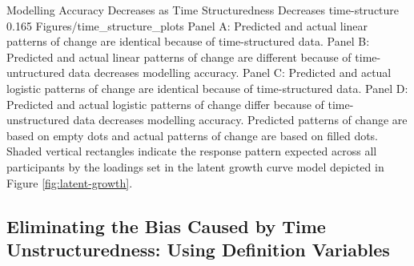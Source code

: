 \documentclass[
12pt, %
twoside,
english]{guelphthesis}
\begin{document}
\begin{apaFigure}
[portrait]
[samepage]
[-0.2cm]
{Modelling Accuracy Decreases as Time Structuredness Decreases}
{time-structure}
{0.165}
{Figures/time_structure_plots}
{Panel A: Predicted and actual linear patterns of change are identical because of time-structured data. Panel B: Predicted and actual linear patterns of change are different because of time-untructured data decreases modelling accuracy. Panel C: Predicted and actual logistic patterns of change are identical because of time-structured data. Panel D: Predicted and actual logistic patterns of change differ because of time-unstructured data decreases modelling accuracy. Predicted patterns of change are based on empty dots and actual patterns of change are based on filled dots. Shaded vertical rectangles indicate the response pattern expected across all participants by the loadings set in the latent growth curve model depicted in Figure \ref{fig:latent-growth}.}
\end{apaFigure}
\hypertarget{def-variables}{%
\subsection{Eliminating the Bias Caused by Time Unstructuredness: Using Definition Variables}\label{def-variables}}
\end{document}
